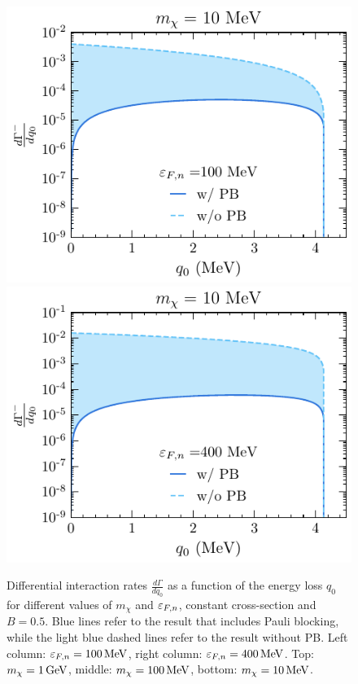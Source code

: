 \begin{figure}[t!bp]
    \includegraphics[width=.48\textwidth]{capture_1/diff_intrate_n0_mu_100MeV_mdm10MeV.pdf}
    \includegraphics[width=.48\textwidth]{capture_1/diff_intrate_n0_mu_400MeV_mdm10MeV.pdf}
    \caption{Differential interaction rates $\frac{d\Gamma}{dq_0}$  
    as a function of the energy loss $q_0$ for different values of $m_\chi$ and $\varepsilon_{F,n}$, constant cross-section and $B=0.5$. Blue lines refer to the result that includes Pauli blocking, while the light blue dashed lines refer to the result without PB. Left column:  $\varepsilon_{F,n}=100{\rm \,MeV}$, right column: $\varepsilon_{F,n}=400{\rm \,MeV}$. Top: $m_\chi=1{\rm \,GeV}$, middle: $m_\chi=100{\rm \,MeV}$, bottom: $m_\chi=10{\rm \,MeV}$.  }
    \label{ch3:fig:gammaNPBmu}
\end{figure}




